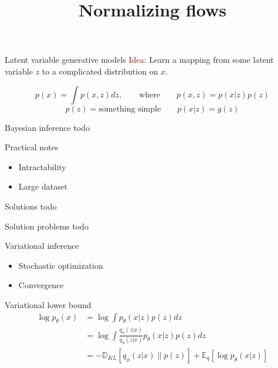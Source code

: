 \documentclass[unicode,11pt]{beamer}
\title{\large{Normalizing flows}}
\begin{document}
\begin{frame}
  \maketitle
\end{frame}

\begin{frame}[fragile]{Latent variable generative models}
\textcolor{darkred}{Idea}: Learn a mapping from some latent variable $z$
to a complicated distribution on $x$.

$$p(x) = \int{p(x, z) dz}, \qquad\text{where}\qquad p(x, z) = p(x|z)p(z)$$
$$p(z) = \text{something simple}  \qquad  p(x|z) = g(z)$$
\end{frame}


\begin{frame}[fragile]{Bayesian inference}
todo
\end{frame}


\begin{frame}[fragile]{Practical notes}
  \begin{itemize}
    \item Intractability
    \item Large dataset
  \end{itemize}
\end{frame}

\begin{frame}[fragile]{Solutions}
todo
\end{frame}

\begin{frame}[fragile]{Solution problems}
todo
\end{frame}

\begin{frame}[fragile]{Variational inference}
  \begin{itemize}
    \item Stochastic optimization
    \item Convergence
  \end{itemize}
\end{frame}


\begin{frame}[fragile]{Variational lower bound}
\begin{align*} 
\log {p_\theta (x)} &= \log \int {p_\theta (x|z) p(z) dz} \\
&= \log \int{ \frac{q_\phi (z|x)}{q_\phi (z|x)} p_\theta (x|z) p(z) dz} \\
&= -\mathbb{D}_{KL}[q_\phi (z|x) \parallel p(z)] + \mathbb{E}_q [\log p_\theta (x|z)]
\end{align*} 

\end{frame}
\end{document}
